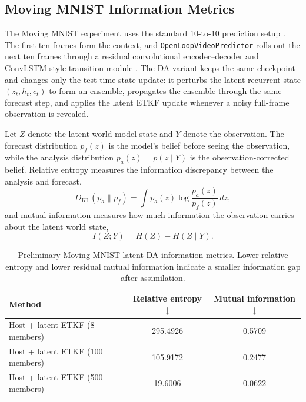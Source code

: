\documentclass{article}
\begin{document}
\subsection{Moving MNIST Information Metrics}

The Moving MNIST experiment uses the standard 10-to-10 prediction setup \citep{srivastava2015unsupervised}. The first ten frames form the context, and \texttt{OpenLoopVideoPredictor} rolls out the next ten frames through a residual convolutional encoder--decoder and ConvLSTM-style transition module \citep{shi2015convlstm}. The DA variant keeps the same checkpoint and changes only the test-time state update: it perturbs the latent recurrent state $(z_t,h_t,c_t)$ to form an ensemble, propagates the ensemble through the same forecast step, and applies the latent ETKF update whenever a noisy full-frame observation is revealed.

Let $Z$ denote the latent world-model state and $Y$ denote the observation. The forecast distribution $p_f(z)$ is the model's belief before seeing the observation, while the analysis distribution $p_a(z)=p(z\mid Y)$ is the observation-corrected belief. Relative entropy measures the information discrepancy between the analysis and forecast,
\begin{equation}
    D_{\mathrm{KL}}(p_a\|p_f)
    =
    \int p_a(z)\log\frac{p_a(z)}{p_f(z)}\,dz,
\end{equation}
and mutual information measures how much information the observation carries about the latent world state,
\begin{equation}
    I(Z;Y)=H(Z)-H(Z\mid Y).
\end{equation}

\begin{table}[H]
    \centering
    \caption{Preliminary Moving MNIST latent-DA information metrics. Lower relative entropy and lower residual mutual information indicate a smaller information gap after assimilation.}
    \label{tab:mnist-da-prelim}
    \begin{tabular}{lcc}
        \toprule
        Method & Relative entropy $\downarrow$ & Mutual information $\downarrow$ \\
        \midrule
        Host + latent ETKF (8 members) & 295.4926 & 0.5709 \\
        Host + latent ETKF (100 members) & 105.9172 & 0.2477 \\
        Host + latent ETKF (500 members) & 19.6006 & 0.0622 \\
        \bottomrule
    \end{tabular}
\end{table}
\end{document}
